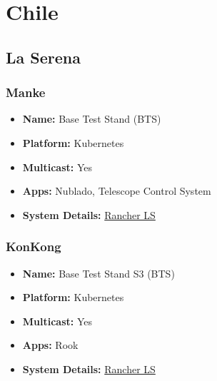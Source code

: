 \section{Chile}
\subsection{La Serena}
\subsubsection{Manke}
\begin{itemize}
  \itemsep0em 
  \item \textbf{Name:}      Base Test Stand (BTS)
  \item \textbf{Platform:}  Kubernetes
  \item \textbf{Multicast:} Yes
  \item \textbf{Apps:}      Nublado, Telescope Control System
  \item \textbf{System Details:} \href{https://rancher.ls.lsst.org}{Rancher LS}  
\end{itemize}

\subsubsection{KonKong}
\begin{itemize}
  \itemsep0em 
  \item \textbf{Name:}      Base Test Stand S3 (BTS)
  \item \textbf{Platform:}  Kubernetes
  \item \textbf{Multicast:} Yes
  \item \textbf{Apps:}      Rook
  \item \textbf{System Details:} \href{https://rancher.ls.lsst.org}{Rancher LS}  
\end{itemize}

